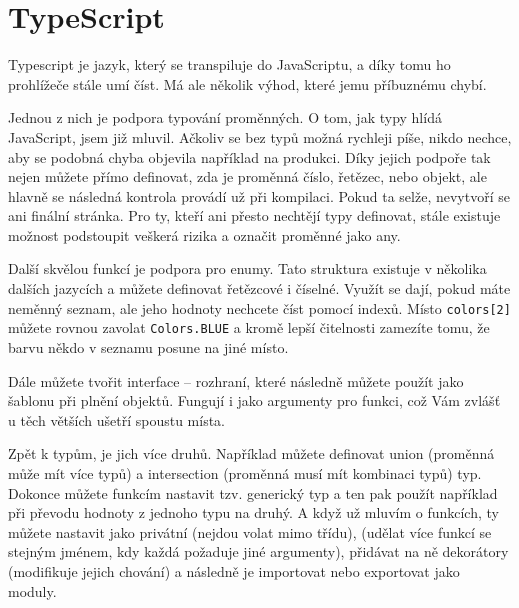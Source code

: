\section{TypeScript}

Typescript je jazyk, který se transpiluje do JavaScriptu, a díky tomu ho prohlížeče stále umí číst. Má ale několik výhod, které jemu příbuznému chybí.

Jednou z nich je podpora typování proměnných. O tom, jak typy hlídá JavaScript, jsem již mluvil. Ačkoliv se bez typů možná rychleji píše, nikdo nechce, aby se podobná chyba objevila například na produkci. Díky jejich podpoře tak nejen můžete přímo definovat, zda je proměnná číslo, řetězec, nebo objekt, ale hlavně se následná kontrola provádí už při kompilaci. Pokud ta selže, nevytvoří se ani finální stránka. Pro ty, kteří ani přesto nechtějí typy definovat, stále existuje možnost podstoupit veškerá rizika a označit proměnné jako any.

Další skvělou funkcí je podpora pro enumy.\cite{WhatIsAnEnum} Tato struktura existuje v několika dalších jazycích a můžete definovat řetězcové i číselné. Využít se dají, pokud máte neměnný seznam, ale jeho hodnoty nechcete číst pomocí indexů. Místo \texttt{colors[2]} můžete rovnou zavolat \texttt{Colors.BLUE} a kromě lepší čitelnosti zamezíte tomu, že barvu někdo v seznamu posune na jiné místo.

Dále můžete tvořit interface – rozhraní, které následně můžete použít jako šablonu při plnění objektů. Fungují i jako argumenty pro funkci, což Vám zvlášť u těch větších ušetří spoustu místa.

Zpět k typům, je jich více druhů. Například můžete definovat union (proměnná může mít více typů) a intersection (proměnná musí mít kombinaci typů) typ. Dokonce můžete funkcím nastavit tzv. generický typ a ten pak použít například při převodu hodnoty z jednoho typu na druhý.\cite{TSGenerics} A když už mluvím o funkcích, ty můžete nastavit jako privátní (nejdou volat mimo třídu),  (udělat více funkcí se stejným jménem, kdy každá požaduje jiné argumenty), přidávat na ně dekorátory (modifikuje jejich chování) a následně je importovat nebo exportovat jako moduly.